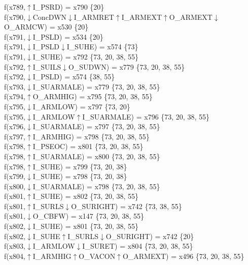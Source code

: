 f(x789,$\uparrow$I\_PSRD) = x790 \{20\} \\  
f(x790,$\downarrow$ConcDWN$\downarrow$I\_ARMRET$\uparrow$I\_ARMEXT$\uparrow$O\_ARMEXT$\downarrow$O\_ARMCW) = x530 \{20\} \\  
f(x791,$\downarrow$I\_PSLD) = x534 \{20\} \\  
f(x791,$\downarrow$I\_PSLD$\downarrow$I\_SUHE) = x574 \{73\} \\  
f(x791,$\downarrow$I\_SUHE) = x792 \{73, 20, 38, 55\} \\  
f(x792,$\uparrow$I\_SUILS$\downarrow$O\_SUDWN) = x779 \{73, 20, 38, 55\} \\  
f(x792,$\downarrow$I\_PSLD) = x574 \{38, 55\} \\  
f(x793,$\downarrow$I\_SUARMALE) = x779 \{73, 20, 38, 55\} \\  
f(x794,$\uparrow$O\_ARMHIG) = x795 \{73, 20, 38, 55\} \\  
f(x795,$\downarrow$I\_ARMLOW) = x797 \{73, 20\} \\  
f(x795,$\downarrow$I\_ARMLOW$\uparrow$I\_SUARMALE) = x796 \{73, 20, 38, 55\} \\  
f(x796,$\downarrow$I\_SUARMALE) = x797 \{73, 20, 38, 55\} \\  
f(x797,$\uparrow$I\_ARMHIG) = x798 \{73, 20, 38, 55\} \\  
f(x798,$\uparrow$I\_PSEOC) = x801 \{73, 20, 38, 55\} \\  
f(x798,$\uparrow$I\_SUARMALE) = x800 \{73, 20, 38, 55\} \\  
f(x798,$\uparrow$I\_SUHE) = x799 \{73, 20, 38\} \\  
f(x799,$\downarrow$I\_SUHE) = x798 \{73, 20, 38\} \\  
f(x800,$\downarrow$I\_SUARMALE) = x798 \{73, 20, 38, 55\} \\  
f(x801,$\uparrow$I\_SUHE) = x802 \{73, 20, 38, 55\} \\  
f(x801,$\uparrow$I\_SURLS$\downarrow$O\_SURIGHT) = x742 \{73, 38, 55\} \\  
f(x801,$\downarrow$O\_CBFW) = x147 \{73, 20, 38, 55\} \\  
f(x802,$\downarrow$I\_SUHE) = x801 \{73, 20, 38, 55\} \\  
f(x802,$\downarrow$I\_SUHE$\uparrow$I\_SURLS$\downarrow$O\_SURIGHT) = x742 \{20\} \\  
f(x803,$\downarrow$I\_ARMLOW$\downarrow$I\_SURET) = x804 \{73, 20, 38, 55\} \\  
f(x804,$\uparrow$I\_ARMHIG$\uparrow$O\_VACON$\uparrow$O\_ARMEXT) = x496 \{73, 20, 38, 55\} \\  
